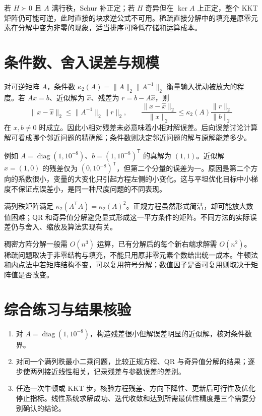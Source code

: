 若 $H\succ0$ 且 $A$ 满行秩，Schur 补正定；若 $H$ 奇异但在 $\ker A$ 上正定，整个 KKT 矩阵仍可能可逆，此时直接的块求逆公式不可用。稀疏直接分解中的填充是原零元素在分解中变为非零的现象，适当排序可降低存储和运算成本。

\section{条件数、舍入误差与规模}

对可逆矩阵 $A$，条件数 $\kappa_2(A)=\|A\|_2\|A^{-1}\|_2$ 衡量输入扰动被放大的程度。若 $Ax=b$、近似解为 $\widehat x$、残差为 $r=b-A\widehat x$，则
\[
 \|x-\widehat x\|_2\leq\|A^{-1}\|_2\|r\|_2,
 \qquad
 \frac{\|x-\widehat x\|_2}{\|x\|_2}
 \leq\kappa_2(A)\frac{\|r\|_2}{\|b\|_2}
\]
在 $x,b\ne0$ 时成立。因此小相对残差未必意味着小相对解误差。后向误差讨论计算解可看成哪个邻近问题的精确解；条件数则决定邻近问题的解与原解能差多少。

例如 $A=\operatorname{diag}(1,10^{-8})$、$b=(1,10^{-8})^{\mathsf T}$ 的真解为 $(1,1)$。近似解 $\widehat x=(1,0)$ 的残差仅为 $(0,10^{-8})^{\mathsf T}$，但第二个分量的误差为一。原因是第二个方向的系数很小，变量的大变化只引起方程左侧的小变化。这与平坦优化目标中小梯度不保证点误差小，是同一种尺度问题的不同表现。

满列秩矩阵满足 $\kappa_2(A^{\mathsf T}A)=\kappa_2(A)^2$。正规方程虽然形式简洁，却可能放大数值困难；QR 和奇异值分解避免显式形成这一平方条件的矩阵。不同方法的实际误差仍与舍入、缩放及算法实现有关。

稠密方阵分解一般需 $O(n^3)$ 运算，已有分解后的每个新右端求解需 $O(n^2)$。稀疏问题取决于非零结构与填充，不能只用原非零元素个数给出统一成本。牛顿法和内点法中若矩阵结构不变，可以复用符号分解；数值因子是否可复用则取决于矩阵值是否改变。

\section{综合练习与结果核验}
\begin{enumerate}
 \item 对 $A=\operatorname{diag}(1,10^{-8})$，构造残差很小但解误差明显的近似解，核对条件数界。
 \item 对同一个满列秩最小二乘问题，比较正规方程、QR 与奇异值分解的结果；逐步使两列接近线性相关，记录残差与参数误差的差别。
 \item 任选一次牛顿或 KKT 步，核验方程残差、方向下降性、更新后可行性及优化停止指标。线性系统求解成功、迭代收敛和达到所需最优性精度是三个需要分别确认的结论。
\end{enumerate}

